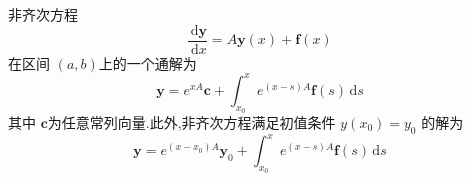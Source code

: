 \documentclass[lang=cn,12pt,color=green,fontset=none]{elegantbook}
\begin{document}
\begin{corollary}\label{cor:nonhomo-linear-eq-gen-sol}
    非齐次方程
    \begin{equation}
        \frac{\,\mathrm{d} \mathbf{y} }{ \,\mathrm{d} x} = A \mathbf{y}\left( x \right)+  \mathbf{f}\left( x \right)   
    \end{equation}
    在区间 $ \left( a,b \right)  $上的一个通解为 
    \begin{equation}
        \mathbf{y} = e^{xA}\mathbf{c}+ \int_{x_0}^{x}e^{\left( x-s \right)A} \mathbf{f}\left( s \right)\,\mathrm{d} s
    \end{equation}其中 $ \mathbf{c} $为任意常列向量.此外,非齐次方程满足初值条件 $ y\left( x_0 \right)=y_0  $  的解为 
    \begin{equation}
        \mathbf{y}= e^{\left( x-x_0 \right) A}\mathbf{y}_{0}+  \int_{x_0}^{x}e^{\left( x-s \right)A }\mathbf{f}\left( s \right)\,\mathrm{d} s 
    \end{equation}
\end{corollary}
\end{document}
